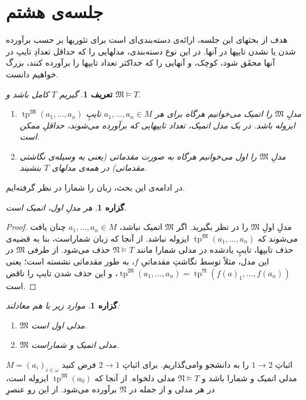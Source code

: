 \documentclass[12pt,a4paper]{report}
\theoremstyle{colorhead}
\newtheorem{prop}[thm]{گزاره}
\newtheorem{defn}[thm]{تعریف}
\DeclareMathOperator{\tp}{tp}
\begin{document}
\section{جلسه‌ی هشتم}
هدف از بحثهای این جلسه، ارائه‌ی دسته‌بندی‌ای است برای تئوریها بر حسب
برآورده شدن یا نشدن تایپها در آنها. در این نوع دسته‌بندی، مدلهایی را که حداقل
تعدادِ تایپ در آنها محقَق شود، کوچک، و آنهایی را که 
حداکثر تعداد تایپها را برآورده کنند، بزرگ خواهیم دانست. 
\begin{defn}
گیریم
$T$
کامل باشد و 
$\mathfrak{M}\models T$.
\begin{enumerate}
\item 
مدلِ
$\mathfrak{M}$
را 
اتمیک
می‌خوانیم هرگاه برای هر
$a_1,\ldots,a_n\in M$
تایپِ
$\tp^\mathfrak{M}(a_1,\ldots,a_n)$
ایزوله باشد. 
در یک مدل اتمیک، تعداد تایپهایی که برآورده می‌شوند، حداقلِ ممکن است. 
\item
مدلِ
 $\mathfrak{M}$
را اول 
می‌خوانیم هرگاه به صورت مقدماتی 
(یعنی به وسیله‌ی نگاشتی مقدماتی)
 در همه‌ی مدلهای
$T$
بنشیند.
\end{enumerate}
\end{defn}
در ادامه‌ی این بحث، زبان را شمارا در نظر گرفته‌ایم.
\begin{prop}
هر مدلِ اول، اتمیک است.
\end{prop}
\begin{proof}
مدلِ
اولِ
$\mathfrak{M}$
را در نظر بگیرید. اگر
$\mathfrak{M}$
اتمیک نباشد، 
$a_1,\ldots,a_n\in M$
چنان یافت می‌شوند که 
$\tp^\mathfrak{M}(a_1,\ldots,a_n)$
ایزوله نباشد. از آنجا که زبان شماراست، بنا به قضیه‌ی حذف تایپها،
تایپِ یادشده در
مدلی شمارا مانند
$\mathfrak{N}\models T$
حذف می‌شود. از طرفی
$\mathfrak{M}$
در این مدل، مثلاً توسط نگاشتِ
مقدماتیِ
$f$،
به طور مقدماتی نشسته است؛ یعنی
\mbox{$\tp^\mathfrak{M}(a_1,\ldots,a_n)=\tp^\mathfrak{N}(f(a)_1,\ldots,f(a_n))$}،
و این حذف شدن تایپ را ناقض است. 
\end{proof}
\begin{prop}
موارد زیر با هم معادلند:
\begin{enumerate}
\item 
$\mathfrak{M}$
مدلی اول است.
\item 
$\mathfrak{M}$
مدلی اتمیک و شماراست.
\end{enumerate}
\end{prop}
اثباتِ 
$1\to 2$
را به دانشجو وامی‌گذاریم. برای اثباتِ
$2\to 1$
فرض کنید 
$M=(a_i)_{i\in \omega}$
مدلی اتمیک  و شمارا باشد و 
$\mathfrak{N}\models T$
مدلی دلخواه. از آنجا که
$\tp^\mathfrak{M}(a_0)$
ایزوله است، در هر مدلی و از جمله در
$\mathfrak{N}$
برآورده می‌شود. از این رو عنصرِ
\end{document}
